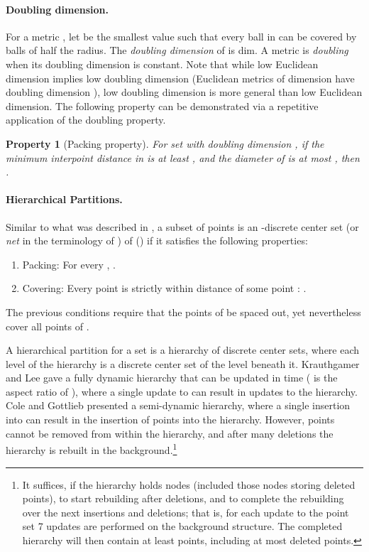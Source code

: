 \documentclass[11pt]{article}
\newtheorem{property}{Property}
\begin{document}
\paragraph{Doubling dimension.}

For a metric , let  be the smallest value such that every
ball in  can be covered by  balls of half the radius. The {\em
doubling dimension} of  is dim. A metric is {\em doubling}
when its doubling dimension is constant. Note that while low Euclidean
dimension implies low doubling dimension (Euclidean metrics of dimension
 have doubling dimension  \cite{GuKrLe03}), low doubling
dimension is more general than low Euclidean dimension.
The following property can be demonstrated via a repetitive application of
the doubling property.

\begin{property}[Packing property]\label{prop:doubling}
For set  with doubling dimension , if the minimum
interpoint distance in  is at least , and the diameter
of  is at most , then .
\end{property}


\paragraph{Hierarchical Partitions.}\label{sec-hier}

Similar to what was described in \cite{GaoGuiNgu04,KrLe04}, a subset of
points  is an -discrete center set (or {\em net} in
the terminology of \cite{KrLe04}) of  () if it satisfies the
following properties:
\renewcommand{\labelenumi}{(\roman{enumi})}
\begin{enumerate}
\item Packing: For every , .
\item Covering: Every point  is strictly within distance  of
some point : .
\end{enumerate}
The previous conditions require that the points of  be spaced out, yet
nevertheless cover all points of .

A hierarchical partition for a set  is a hierarchy of discrete center
sets, where each level of the hierarchy is a discrete center set of the
level beneath it. Krauthgamer and Lee \cite{KrLe04} gave a fully dynamic
hierarchy that can be updated in time 
( is the aspect ratio of ), where a single update to  can result in
 updates to the hierarchy. Cole and
Gottlieb \cite{CoGo06} presented a semi-dynamic hierarchy, where a single insertion into
 can result in the insertion of  points into the hierarchy.
However, points cannot be removed from within the hierarchy, and after many deletions the
hierarchy is rebuilt in the background.\footnote{It suffices, if the hierarchy holds 
nodes (included those nodes storing deleted points), to start
rebuilding after  deletions, and to complete the
rebuilding over the next  insertions and deletions;
that is, for each update to the point set 7 updates are performed
on the background structure. The completed hierarchy
will then contain at least  points, including at
most  deleted points.}
\end{document}
